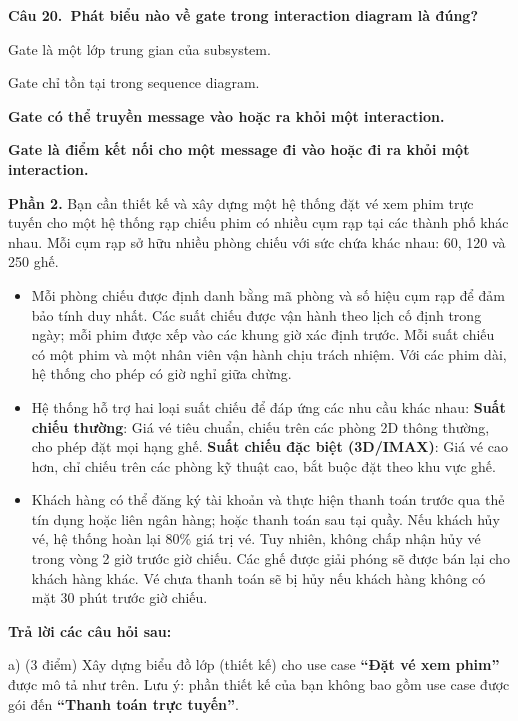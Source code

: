 \documentclass[11pt,a4paper]{article}
\newcommand{\cau}[2]{\par\vspace{2pt}\noindent\textbf{Câu #1.\ #2}\par\vspace{1pt}}
\newenvironment{pa}{\begin{list}{}{\leftmargin=0.95cm\labelwidth=0.5cm\labelsep=0.3cm\itemsep=1pt\parsep=0pt\topsep=0pt\partopsep=0pt}}{\end{list}}
\newcommand{\A}{\item[A.]}
\newcommand{\B}{\item[B.]}
\newcommand{\C}{\item[C.]}
\newcommand{\D}{\item[D.]}
\begin{document}
\cau{20}{Phát biểu nào về gate trong interaction diagram là đúng?}
\begin{pa}
\A Gate là một lớp trung gian của subsystem.
\B Gate chỉ tồn tại trong sequence diagram.
\C {\bfseries Gate có thể truyền message vào hoặc ra khỏi một interaction.}
\D {\bfseries Gate là điểm kết nối cho một message đi vào hoặc đi ra khỏi một interaction.}
\end{pa}

\newpage
\noindent\textbf{Phần 2.} Bạn cần thiết kế và xây dựng một hệ thống đặt vé xem phim trực tuyến cho một hệ thống rạp chiếu phim có nhiều cụm rạp tại các thành phố khác nhau. Mỗi cụm rạp sở hữu nhiều phòng chiếu với sức chứa khác nhau: 60, 120 và 250 ghế.
\begin{itemize}[leftmargin=1.05cm]
\item Mỗi phòng chiếu được định danh bằng mã phòng và số hiệu cụm rạp để đảm bảo tính duy nhất. Các suất chiếu được vận hành theo lịch cố định trong ngày; mỗi phim được xếp vào các khung giờ xác định trước. Mỗi suất chiếu có một phim và một nhân viên vận hành chịu trách nhiệm. Với các phim dài, hệ thống cho phép có giờ nghỉ giữa chừng.
\item Hệ thống hỗ trợ hai loại suất chiếu để đáp ứng các nhu cầu khác nhau: \textbf{Suất chiếu thường}: Giá vé tiêu chuẩn, chiếu trên các phòng 2D thông thường, cho phép đặt mọi hạng ghế. \textbf{Suất chiếu đặc biệt (3D/IMAX)}: Giá vé cao hơn, chỉ chiếu trên các phòng kỹ thuật cao, bắt buộc đặt theo khu vực ghế.
\item Khách hàng có thể đăng ký tài khoản và thực hiện thanh toán trước qua thẻ tín dụng hoặc liên ngân hàng; hoặc thanh toán sau tại quầy. Nếu khách hủy vé, hệ thống hoàn lại 80\% giá trị vé. Tuy nhiên, không chấp nhận hủy vé trong vòng 2 giờ trước giờ chiếu. Các ghế được giải phóng sẽ được bán lại cho khách hàng khác. Vé chưa thanh toán sẽ bị hủy nếu khách hàng không có mặt 30 phút trước giờ chiếu.
\end{itemize}


\noindent\textbf{Trả lời các câu hỏi sau:}

\noindent a) (3 điểm) Xây dựng biểu đồ lớp (thiết kế) cho use case \textbf{``Đặt vé xem phim''} được mô tả như trên. Lưu ý: phần thiết kế của bạn không bao gồm use case được gói đến \textbf{``Thanh toán trực tuyến''}.
\end{document}
